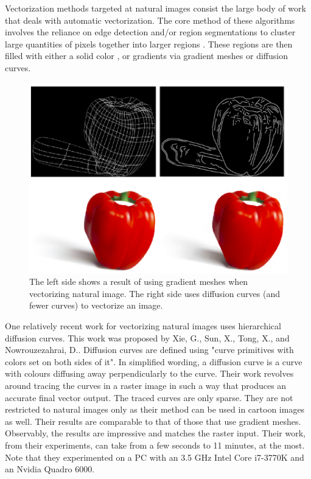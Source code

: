 Vectorization methods targeted at natural images consist the large body of work that deals with automatic vectorization. The core method of these algorithms involves the reliance on edge detection and/or region segmentations to cluster large quantities of pixels together into larger regions \cite{depixelizingpixelart}. These regions are then filled with either a solid color \cite{anovelmethodforvectorization}, or gradients via gradient meshes \cite{optimizedgradientmeshes}\cite{barendrecht2018locally} or diffusion curves\cite{hierarchicaldiffusioncurves}.

\begin{figure}[h]
	\centering
	\includegraphics[scale=1.0]{images/chap02-rrl/diffusion-curves.png}
	\caption{The left side shows a result of using gradient meshes when vectorizing natural image. The right side uses diffusion curves (and fewer curves) to vectorize an image.}
	\label{fig:diffusion-curves}
\end{figure}

One relatively recent work for vectorizing natural images uses hierarchical diffusion curves. This work was proposed by Xie, G., Sun, X., Tong, X., and Nowrouzezahrai, D.. Diffusion curves are defined using "curve primitives with colors set on both sides of it". In simplified wording, a diffusion curve is a curve with colours diffusing away perpendicularly to the curve. Their work revolves around tracing the curves in a raster image in such a way that produces an accurate final vector output. The traced curves are only sparse. They are not restricted to natural images only as their method can be used in cartoon images as well. Their results are comparable to that of those that use gradient meshes. Observably, the results are impressive and matches the raster input. Their work, from their experiments, can take from a few seconds to 11 minutes, at the most. Note that they experimented on a PC with an 3.5 GHz Intel Core i7-3770K and an Nvidia Quadro 6000.

